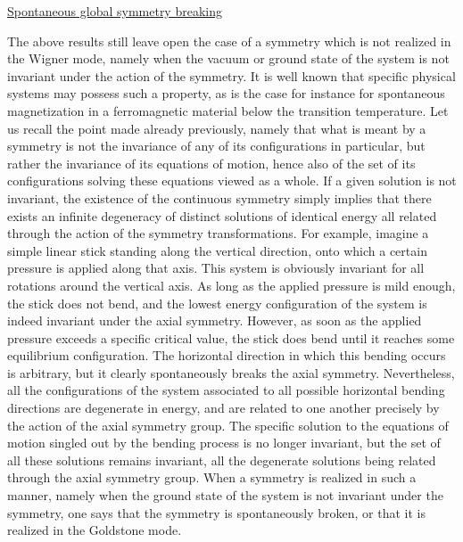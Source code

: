 \documentclass[a4paper,11pt]{article}
\begin{document}
\vspace{10pt}

\noindent\underline{Spontaneous global symmetry breaking}

\vspace{5pt}

The above results still leave open the case of a symmetry which is not
realized in the Wigner mode, namely when the vacuum or ground state of the
system is not invariant under the action of the symmetry. It is well known 
that specific physical systems may possess such a property, as is the case
for instance for spontaneous magnetization in a ferromagnetic material
below the transition temperature. Let us recall the point made already
previously, namely that what is meant by a symmetry is not the invariance of
any of its configurations in particular, but rather the invariance of its 
equations of motion, hence also of the set of its configurations solving 
these equations viewed as a whole. If a given solution is not invariant, 
the existence of the continuous symmetry simply implies that there exists 
an infinite degeneracy of distinct solutions of identical energy all related 
through the action of the symmetry transformations. For example, imagine a 
simple linear stick standing along the vertical direction, onto which a 
certain pressure is applied along that axis. This system is obviously 
invariant for all rotations around the vertical axis. As long as the applied 
pressure is mild enough, the stick does not bend, and the lowest energy 
configuration of the system is indeed invariant under the axial symmetry. 
However, as soon as the applied pressure exceeds a specific critical value, 
the stick does bend until it reaches some equilibrium con\-fi\-gu\-ra\-tion. 
The horizontal direction in which this bending occurs is arbitrary, but it 
clearly spontaneously breaks the axial symmetry. Nevertheless, all the 
configurations of the system associated to all possible horizontal bending 
directions are degenerate in energy, and are related to one another precisely 
by the action of the axial symmetry group. The specific solution to the 
equations of motion singled out by the bending process is no longer 
invariant, but the set of all these solutions remains invariant, all the 
degenerate solutions being related through the axial symmetry group. When 
a symmetry is realized in such a manner, namely when the ground state of 
the system is not invariant under the symmetry, one says that the symmetry 
is spontaneously broken, or that it is realized in the Goldstone mode.
\end{document}
